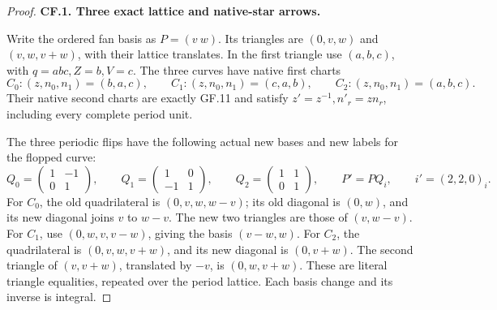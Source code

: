 \begin{proof}
\par\medskip\noindent\textbf{CF.1. Three exact lattice and native-star arrows.}\par\nopagebreak[4]

Write the ordered fan basis as \(P=(v\ w)\). Its triangles are
\((0,v,w)\) and \((v,w,v+w)\), with their lattice translates.
In the first triangle use \((a,b,c)\), with
\(q=abc, Z=b,V=c\). The three curves have native first charts
\[
 C_0:(z,n_0,n_1)=(b,a,c),\qquad
 C_1:(z,n_0,n_1)=(c,a,b),\qquad
 C_2:(z,n_0,n_1)=(a,b,c).                              \tag{P3K.59.CF.1}
\]
Their native second charts are exactly GF.11 and satisfy
\(z'=z^{-1},n'_r=zn_r\), including every complete period unit.

The three periodic flips have the following actual new bases and
new labels for the flopped curve:
\[
 Q_0=\begin{pmatrix}1&-1\\0&1\end{pmatrix},\qquad
 Q_1=\begin{pmatrix}1&0\\-1&1\end{pmatrix},\qquad
 Q_2=\begin{pmatrix}1&1\\0&1\end{pmatrix},
 \qquad P'=PQ_i,\qquad i'=(2,2,0)_i.                  \tag{P3K.59.CF.2}
\]
For \(C_0\), the old quadrilateral is
\((0,v,w,w-v)\); its old diagonal is \((0,w)\), and its new
diagonal joins \(v\) to \(w-v\). The new two triangles are those
of \((v,w-v)\). For \(C_1\), use
\((0,w,v,v-w)\), giving the basis \((v-w,w)\).
For \(C_2\), the quadrilateral is \((0,v,w,v+w)\), and its
new diagonal is \((0,v+w)\). The second triangle of
\((v,v+w)\), translated by \(-v\), is \((0,w,v+w)\).
These are literal triangle equalities, repeated over the period
lattice. Each basis change and its inverse is integral.


\end{proof}
